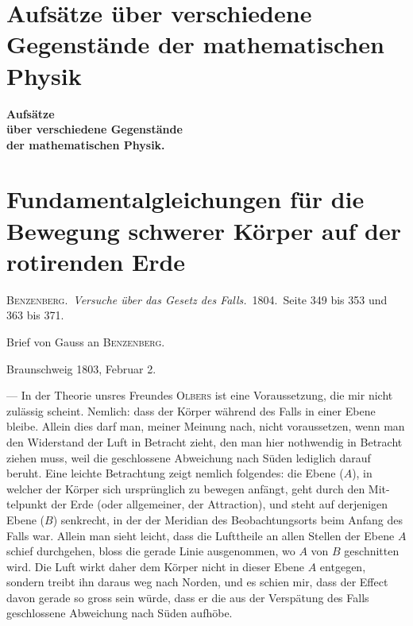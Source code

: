 \documentclass[12pt,a4paper]{article}
\begin{document}
\section*{Aufsätze über verschiedene Gegenstände der mathematischen Physik}

\begin{center}
\Large\bfseries
Aufsätze\\[0.5em]
über verschiedene Gegenstände\\[0.5em]
der mathematischen Physik.
\end{center}

\newpage
\section*{Fundamentalgleichungen für die Bewegung schwerer Körper auf der rotirenden Erde}

\textsc{Benzenberg.}\ \textit{Versuche über das Gesetz des Falls.}\ 1804.\ Seite 349 bis 353 und 363 bis 371.

Brief von Gauss an \textsc{Benzenberg}.

Braunschweig 1803, Februar 2.

\medskip

\noindent
--- In der Theorie unsres Freundes \textsc{Olbers} ist eine Voraussetzung, die 
mir nicht zulässig scheint. Nemlich: dass der Körper während des Falls in einer 
Ebene bleibe. Allein dies darf man, meiner Meinung nach, nicht voraussetzen, 
wenn man den Widerstand der Luft in Betracht zieht, den man hier nothwendig 
in Betracht ziehen muss, weil die geschlossene Abweichung nach Süden lediglich 
darauf beruht. Eine leichte Betrachtung zeigt nemlich folgendes: die Ebene ($A$), 
in welcher der Körper sich ursprünglich zu bewegen anfängt, geht durch den Mit-
telpunkt der Erde (oder allgemeiner, der Attraction), und steht auf derjenigen 
Ebene ($B$) senkrecht, in der der Meridian des Beobachtungsorts beim Anfang 
des Falls war. Allein man sieht leicht, dass die Lufttheile an allen Stellen der 
Ebene $A$ schief durchgehen, bloss die gerade Linie ausgenommen, wo $A$ von $B$ geschnitten wird. Die Luft wirkt daher dem Körper nicht in dieser Ebene $A$ 
entgegen, sondern treibt ihn daraus weg nach Norden, und es schien mir, dass 
der Effect davon gerade so gross sein würde, dass er die aus der Verspätung des 
Falls geschlossene Abweichung nach Süden aufhöbe.
\end{document}
